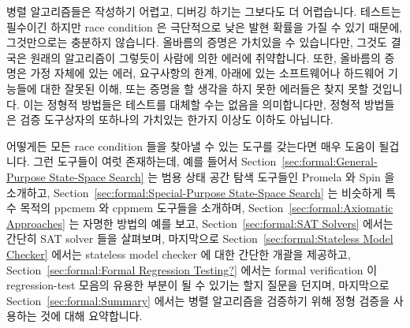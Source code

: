 
%


병렬 알고리즘들은 작성하기 어렵고, 디버깅 하기는 그보다도 더 어렵습니다.
테스트는 필수이긴 하지만 race condition 은 극단적으로 낮은 발현 확률을 가질 수
있기 때문에, 그것만으로는 충분하지 않습니다.
올바름의 증명은 가치있을 수 있습니다만, 그것도 결국은 원래의 알고리즘이
그렇듯이 사람에 의한 에러에 취약합니다.
또한, 올바름의 증명은 가정 자체에 있는 에러, 요구사항의 한계, 아래에 있는
소프트웨어나 하드웨어 기능들에 대한 잘못된 이해, 또는 증명을 할 생각을 하지
못한 에러들은 찾지 못할 것입니다.
이는 정형적 방법들은 테스트를 대체할 수는 없음을 의미합니다만, 정형적 방법들은
검증 도구상자의 또하나의 가치있는 한가지 이상도 이하도 아닙니다.
\iffalse

Parallel algorithms can be hard to write, and even harder to debug.
Testing, though essential, is insufficient, as fatal race conditions
can have extremely low probabilities of occurrence.
Proofs of correctness can be valuable, but in the end are just as
prone to human error as is the original algorithm.
In addition, a proof of correctness cannot be expected to find errors
in your assumptions, shortcomings in the requirements,
misunderstandings of the underlying software or hardware primitives,
or errors that you did not think to construct a proof for.
This means that formal methods can never replace testing, however,
formal methods are nevertheless a valuable addition to your validation toolbox.
\fi

어떻게든 모든 race condition 들을 찾아낼 수 있는 도구를 갖는다면 매우 도움이
될겁니다.
그런 도구들이 여럿 존재하는데, 예를 들어서
Section~\ref{sec:formal:General-Purpose State-Space Search}
는 범용 상태 공간 탐색 도구들인 Promela 와 Spin 을 소개하고,
Section~\ref{sec:formal:Special-Purpose State-Space Search}
는 비슷하게 특수 목적의 ppcmem 와 cppmem 도구들을 소개하며,
Section~\ref{sec:formal:Axiomatic Approaches}
는 자명한 방법의 예를 보고,
Section~\ref{sec:formal:SAT Solvers}
에서는 간단히 SAT solver 들을 살펴보며, 마지막으로
Section~\ref{sec:formal:Stateless Model Checker}
에서는 stateless model checker 에 대한 간단한 개괄을 제공하고,
Section~\ref{sec:formal:Formal Regression Testing?}
에서는 formal verification 이 regression-test 모음의 유용한 부분이 될 수 있기는
할지 질문을 던지며, 마지막으로
Section~\ref{sec:formal:Summary}
에서는 병렬 알고리즘을 검증하기 위해 정형 검증을 사용하는 것에 대해 요약합니다.
\iffalse

